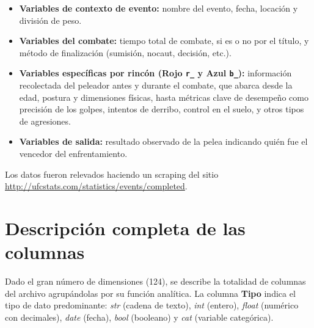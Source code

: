 \documentclass[11pt,a4paper]{article}
\begin{document}
\begin{itemize}[leftmargin=*]
	\item \textbf{Variables de contexto de evento:} nombre del evento, fecha, locación y división de peso.
	\item \textbf{Variables del combate:} tiempo total de combate, si es o no por el título, y método de finalización (sumisión, nocaut, decisión, etc.).
	\item \textbf{Variables específicas por rincón (Rojo \texttt{r\_} y Azul \texttt{b\_}):} información recolectada del peleador antes y durante el combate, que abarca desde la edad, postura y dimensiones físicas, hasta métricas clave de desempeño como precisión de los golpes, intentos de derribo, control en el suelo, y otros tipos de agresiones.
	\item \textbf{Variables de salida:} resultado observado de la pelea indicando quién fue el vencedor del enfrentamiento.
\end{itemize}

Los datos fueron relevados haciendo un scraping del sitio \url{http://ufcstats.com/statistics/events/completed}.

\section{Descripción completa de las columnas}

Dado el gran número de dimensiones (124), se describe la totalidad de columnas del archivo  agrupándolas por su función analítica. La columna \textbf{Tipo} indica el tipo de dato predominante: \textit{str} (cadena de texto), \textit{int} (entero), \textit{float} (numérico con decimales), \textit{date} (fecha), \textit{bool} (booleano) y \textit{cat} (variable categórica).
\end{document}
